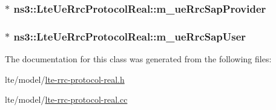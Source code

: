 \subsubsection[{\texorpdfstring{m\+\_\+ue\+Rrc\+Sap\+Provider}{m_ueRrcSapProvider}}]{$\ast$ ns3\+::\+Lte\+Ue\+Rrc\+Protocol\+Real\+::m\+\_\+ue\+Rrc\+Sap\+Provider\hspace{0.3cm}{\ttfamily [private]}}\hypertarget{classns3_1_1LteUeRrcProtocolReal_a1d594fbb2755388a84d4d1d53298b0f8}{}\label{classns3_1_1LteUeRrcProtocolReal_a1d594fbb2755388a84d4d1d53298b0f8}
\subsubsection[{\texorpdfstring{m\+\_\+ue\+Rrc\+Sap\+User}{m_ueRrcSapUser}}]{$\ast$ ns3\+::\+Lte\+Ue\+Rrc\+Protocol\+Real\+::m\+\_\+ue\+Rrc\+Sap\+User\hspace{0.3cm}{\ttfamily [private]}}\hypertarget{classns3_1_1LteUeRrcProtocolReal_ac40d4cc4b269188defcbb5a051d86f05}{}\label{classns3_1_1LteUeRrcProtocolReal_ac40d4cc4b269188defcbb5a051d86f05}


The documentation for this class was generated from the following files\+:\begin{DoxyCompactItemize}
\item 
lte/model/\hyperlink{lte-rrc-protocol-real_8h}{lte-\/rrc-\/protocol-\/real.\+h}\item 
lte/model/\hyperlink{lte-rrc-protocol-real_8cc}{lte-\/rrc-\/protocol-\/real.\+cc}\end{DoxyCompactItemize}
